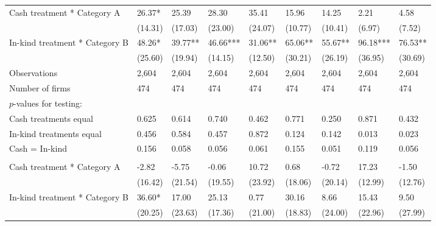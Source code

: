 \documentclass{report}
\begin{document}
\begin{table}[H]
{\begin{tabular}{lllllllll}
\hspace{1em}Cash treatment * Category A & 26.37* & 25.39 & 28.30 & 35.41 & 15.96 & 14.25 & 2.21 & 4.58\\
\hspace{1em} & (14.31) & (17.03) & (23.00) & (24.07) & (10.77) & (10.41) & (6.97) & (7.52)\\
\hspace{1em}In-kind treatment * Category B & 48.26* & 39.77** & 46.66*** & 31.06** & 65.06** & 55.67** & 96.18*** & 76.53**\\
\hspace{1em} & (25.60) & (19.94) & (14.15) & (12.50) & (30.21) & (26.19) & (36.95) & (30.69)\\
\hspace{1em}Observations & 2,604 & 2,604 & 2,604 & 2,604 & 2,604 & 2,604 & 2,604 & 2,604\\
\hspace{1em}Number of firms & 474 & 474 & 474 & 474 & 474 & 474 & 474 & 474\\
\hspace{1em}$p$-values for testing: &  &  &  &  &  &  &  \vphantom{1}& \\
\hspace{1em}\hspace{1em} Cash treatments equal & 0.625 & 0.614 & 0.740 & 0.462 & 0.771 & 0.250 & 0.871 & 0.432\\
\hspace{1em}\hspace{1em} In-kind treatments equal & 0.456 & 0.584 & 0.457 & 0.872 & 0.124 & 0.142 & 0.013 & 0.023\\
\hspace{1em}\hspace{1em} Cash = In-kind & 0.156 & 0.058 & 0.056 & 0.061 & 0.155 & 0.051 & 0.119 & 0.056\\
\addlinespace[0.3em]
\multicolumn{9}{l}{\textbf{Panel B: Males}}\\
\hspace{1em}Cash treatment * Category A & -2.82 & -5.75 & -0.06 & 10.72 & 0.68 & -0.72 & 17.23 & -1.50\\
\hspace{1em} & (16.42) & (21.54) & (19.55) & (23.92) & (18.06) & (20.14) & (12.99) & (12.76)\\
\hspace{1em}In-kind treatment * Category B & 36.60* & 17.00 & 25.13 & 0.77 & 30.16 & 8.66 & 15.43 & 9.50\\
\hspace{1em} & (20.25) & (23.63) & (17.36) & (21.00) & (18.83) & (24.00) & (22.96) & (27.99)\\

\end{tabular}}
\end{table}
\end{document}
